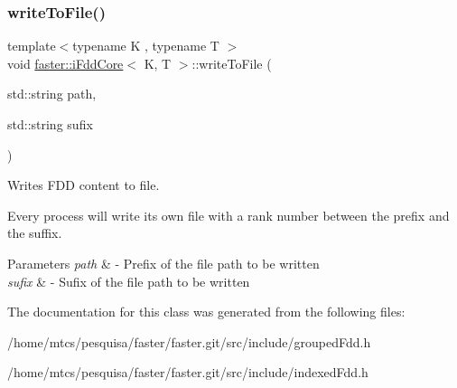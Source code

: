 \subsubsection{\texorpdfstring{write\+To\+File()}{writeToFile()}}
{\footnotesize\ttfamily template$<$typename K , typename T $>$ \\
void \hyperlink{classfaster_1_1iFddCore}{faster\+::i\+Fdd\+Core}$<$ K, T $>$\+::write\+To\+File (\begin{DoxyParamCaption}\item[{std\+::string}]{path,  }\item[{std\+::string}]{sufix }\end{DoxyParamCaption})}



Writes F\+DD content to file. 

Every process will write its own file with a rank number between the prefix and the suffix.


\begin{DoxyParams}{Parameters}
{\em path} & -\/ Prefix of the file path to be written \\
\hline
{\em sufix} & -\/ Sufix of the file path to be written \\
\hline
\end{DoxyParams}


The documentation for this class was generated from the following files\+:\begin{DoxyCompactItemize}
\item 
/home/mtcs/pesquisa/faster/faster.\+git/src/include/grouped\+Fdd.\+h\item 
/home/mtcs/pesquisa/faster/faster.\+git/src/include/indexed\+Fdd.\+h\end{DoxyCompactItemize}
